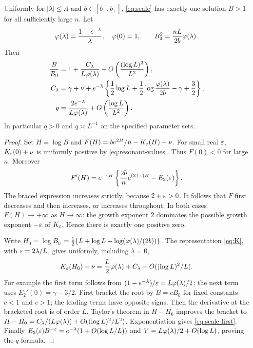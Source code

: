 \begin{theorem}
\label{thm:scale}
Uniformly for $|\lambda|\le\Lambda$ and $b\in[b_-,b_+]$,
\eqref{eq:scale} has exactly one solution $B>1$ for all sufficiently
large $n$. Let
\begin{equation}\label{eq:leading-scale}
 \varphi(\lambda)=\frac{1-e^{-\lambda}}{\lambda},\quad \varphi(0)=1,
 \qquad B_0^2=\frac{nL}{2b}\varphi(\lambda).
\end{equation}
Then
\begin{align}
 \frac B{B_0}
 &=1+\frac{C_\lambda}{L\varphi(\lambda)}
       +O\left(\frac{(\log L)^2}{L^2}\right),\label{eq:scale-first}\\
 C_\lambda
 &=\gamma+\nu+e^{-\lambda}
   \left\{\frac12\log L+\frac12\log\frac{\varphi(\lambda)}{2b}
                   -\gamma+\frac32\right\},\label{eq:C-lambda}\\
 q&=\frac{2e^{-\lambda}}{L\varphi(\lambda)}
          +O\left(\frac{\log L}{L^2}\right).
          \label{eq:q-equivalent}
\end{align}
In particular $q>0$ and $q\asymp L^{-1}$ on the specified parameter sets.
\end{theorem}

\begin{proof}
Set $H=\log B$ and
$F(H)=be^{2H}/n-K_\varepsilon(H)-\nu$. For small real $\varepsilon$,
$K_\varepsilon(0)+\nu$ is uniformly positive by
\eqref{eq:resonant-values}. Thus $F(0)<0$ for large $n$.
Moreover
\[
 F'(H)=e^{-\varepsilon H}
 \left\{\frac{2b}{n}e^{(2+\varepsilon)H}-E_2(\varepsilon)\right\}.
\]
The braced expression increases strictly, because $2+\varepsilon>0$.
It follows that $F$ first decreases and then increases, or increases
throughout. In both cases $F(H)\to+\infty$ as $H\to\infty$:
the growth exponent $2$ dominates the possible growth exponent
$-\varepsilon$ of $K_\varepsilon$. Hence there is exactly one positive zero.

Write $H_0=\log B_0$
$=\tfrac12\{L+\log L+\log(\varphi(\lambda)/(2b))\}$.
The representation \eqref{eq:K}, with
$\varepsilon=2\lambda/L$, gives uniformly, including $\lambda=0$,
\[
 K_\varepsilon(H_0)+\nu
 =\frac L2\varphi(\lambda)+C_\lambda
                   +O((\log L)^2/L).
\]
For example the first term follows from
$(1-e^{-\lambda})/\varepsilon=L\varphi(\lambda)/2$; the next term uses
$E_2'(0)=\gamma-3/2$. First bracket the root by $B=cB_0$
for fixed constants $c<1$ and $c>1$; the leading terms have opposite
signs. Then the derivative at the bracketed root is of order $L$.
Taylor's theorem in $H-H_0$ improves the bracket to
$H-H_0=C_\lambda/(L\varphi(\lambda))+O((\log L)^2/L^2)$.
Exponentiation gives \eqref{eq:scale-first}. Finally
$E_2(\varepsilon)B^{-\varepsilon}=e^{-\lambda}(1+O(\log L/L))$
and $V=L\varphi(\lambda)/2+O(\log L)$, proving the $q$ formula.
\end{proof}
